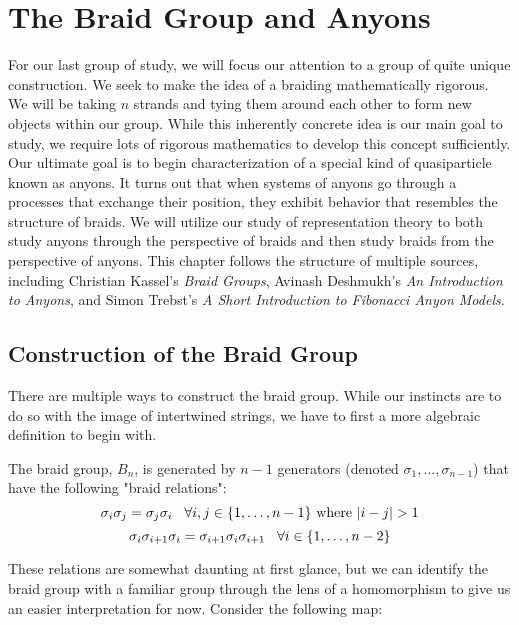 
\chapter{The Braid Group and Anyons}\label{braids}

For our last group of study, we will focus our attention to a group of quite unique construction. We seek to make the idea of a braiding mathematically rigorous. We will be taking $n$ strands and tying them around each other to form new objects within our group. While this inherently concrete idea is our main goal to study, we require lots of rigorous mathematics to develop this concept sufficiently. Our ultimate goal is to begin characterization of a special kind of quasiparticle known as anyons. It turns out that when systems of anyons go through a processes that exchange their position, they exhibit behavior that resembles the structure of braids. We will utilize our study of representation theory to both study anyons through the perspective of braids and then study braids from the perspective of anyons. This chapter follows the structure of multiple sources, including Christian Kassel's \textit{Braid Groups}, Avinash Deshmukh's \textit{An Introduction to Anyons}, and Simon Trebst's \textit{A Short Introduction to Fibonacci Anyon Models}. \cite{Kassel,Deshmukh,Trebst}

\section{Construction of the Braid Group}

There are multiple ways to construct the braid group. While our instincts are to do so with the image of intertwined strings, we have to first a more algebraic definition to begin with.

\begin{definition}
	The braid group, $B_n$, is generated by $n-1$ generators (denoted $\sigma_1,\hdots,\sigma_{n-1}$) that have the following "braid relations":
$$\sigma_i\sigma_j = \sigma_j\sigma_i \hspace{3mm} \forall i,j \in \{1,\hdots,n-1\} \text{ where } |i-j|>1$$
$$\sigma_i\sigma_{i+1}\sigma_i=\sigma_{i+1}\sigma_i\sigma_{i+1} \hspace{3mm} \forall i \in \{1,\hdots,n-2\}$$
\end{definition}

These relations are somewhat daunting at first glance, but we can identify the braid group with a familiar group through the lens of a homomorphism to give us an easier interpretation for now. Consider the following map:

